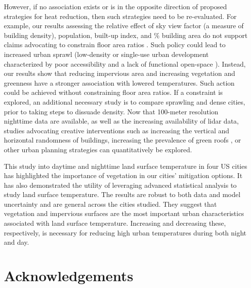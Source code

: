 \documentclass[final,3p,times,onecolumn,sort&compress]{elsarticle}
\begin{document}
However, if no association exists or is in the opposite direction of proposed strategies for heat reduction, then such strategies need to be re-evaluated.
For example, our results assessing the relative effect of sky view factor (a measure of building density), population, built-up index, and \% building area do not support claims advocating to constrain floor area ratios \citep{Chun2017-mm}.
Such policy could lead to increased urban sprawl (low-density or single-use urban development characterized by poor accessibility and a lack of functional open-space \citep{Ewing2015-xj}).
Instead, our results show that reducing impervious area and increasing vegetation and greenness have a stronger association with lowered temperatures.
Such action could be achieved without constraining floor area ratios.
If a constraint is explored, an additional necessary study is to compare sprawling and dense cities, prior to taking steps to dissuade density. 
Now that 100-meter resolution nighttime data are available, as well as the increasing availability of lidar data, studies advocating creative interventions such as increasing the vertical and horizontal randomness of buildings, increasing the prevalence of green roofs \citep{Gago2013-ta, Kelbaugh2019-th}, or other urban planning strategies can quantitatively be explored.

This study into daytime and nighttime land surface temperature in four US cities has highlighted the importance of vegetation in our cities' mitigation options. 
It has also demonstrated the utility of leveraging advanced statistical analysis to study land surface temperature.
The results are robust to both data and model uncertainty and are general across the cities studied.
They suggest that vegetation and impervious surfaces are the most important urban characteristics associated with land surface temperature.
Increasing and decreasing these, respectively, is necessary for reducing high urban temperatures during both night and day.


\section*{Acknowledgements}
\end{document}
